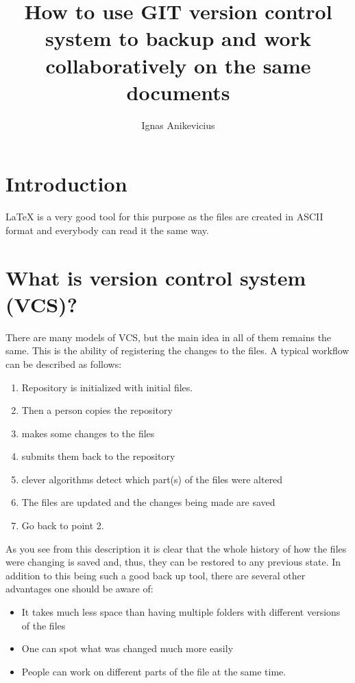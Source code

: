 


\title{How to use GIT version control system to backup and work collaboratively
on the same documents}
\author{Ignas Anikevicius}



\maketitle

\section{Introduction}

\LaTeX{} is a very good tool for this purpose as the files are created in ASCII
format and everybody can read it the same way.

\section{What is version control system (VCS)?}

There are many models of VCS, but the main idea in all of them remains the same.
This is the ability of registering the changes to the files. A typical workflow
can be described as follows:
\begin{enumerate}
    \item Repository is initialized with initial files.
    \item Then a person copies the repository
    \item makes some changes to the files
    \item submits them back to the repository 
    \item clever algorithms detect  which part(s) of the files were altered 
    \item The files are updated and the changes being made are saved
    \item Go back to point 2.
\end{enumerate}

As you see from this description it is clear that the whole history of how the
files were changing is saved and, thus, they can be restored to any previous
state. In addition to this being such a good back up tool, there are several
other advantages one should be aware of:
\begin{itemize}
    \item It takes much less space than having multiple folders with different
        versions of the files
    \item One can spot what was changed much more easily
    \item People can work on different parts of the file at the same time.
\end{itemize}

